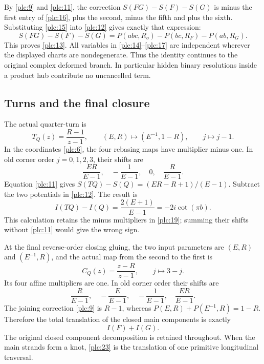 By \eqref{plc:9} and \eqref{plc:11}, the correction \(S(FG)-S(F)-S(G)\) is minus the first
entry of \eqref{plc:16}, plus the second, minus the fifth and plus the sixth.
Substituting \eqref{plc:15} into \eqref{plc:12} gives exactly that expression: \begin{equation}
S(FG)-S(F)-S(G)
                  =P(abc,R_o)-P(bc,R_F)-P(ab,R_G).
\label{plc:17}
\end{equation} This proves \eqref{plc:13}. All variables in \eqref{plc:14}--\eqref{plc:17} are independent
wherever the displayed charts are nondegenerate. Thus the identity
continues to the original complex deformed branch. In particular hidden
binary resolutions inside a product hub contribute no uncancelled term.

\subsection{Turns and the final
closure}\label{turns-and-the-final-closure}

The actual quarter-turn is \begin{equation}
T_Q(z)=\frac{R-1}{z-1},\qquad
 (E,R)\longmapsto(E^{-1},1-R),\qquad j\longmapsto j-1.
\label{plc:18}
\end{equation} In the coordinates \eqref{plc:6}, the four rebasing maps have multiplier minus
one. In old corner order \(j=0,1,2,3\), their shifts are \begin{equation}
\frac{ER}{E-1},\quad-\frac1{E-1},\quad0,\quad\frac R{E-1}.
\label{plc:19}
\end{equation} Equation \eqref{plc:11} gives \(S(TQ)-S(Q)=(ER-R+1)/(E-1)\). Subtract the two
potentials in \eqref{plc:12}. The result is \begin{equation}
I(TQ)-I(Q)=\frac{2(E+1)}{E-1}=-2i\cot(\pi b).
\label{plc:20}
\end{equation} This calculation retains the minus multipliers in \eqref{plc:19}; summing their
shifts without \eqref{plc:11} would give the wrong sign.

At the final reverse-order closing gluing, the two input parameters are
\((E,R)\) and \((E^{-1},R)\), and the actual map from the second to the
first is \begin{equation}
C_Q(z)=\frac{z-R}{z-1},\qquad j\longmapsto3-j.
\label{plc:21}
\end{equation} Its four affine multipliers are one. In old corner order their shifts
are \begin{equation}
\frac R{E-1},\quad-\frac E{E-1},
                       \quad-\frac1{E-1},\quad\frac{ER}{E-1}.
\label{plc:22}
\end{equation} The joining correction \eqref{plc:9} is \(R-1\), whereas
\(P(E,R)+P(E^{-1},R)=1-R\). Therefore the total translation of the
closed main components is exactly \begin{equation}
I(F)+I(G).
\label{plc:23}
\end{equation} The original closed component decomposition is retained throughout.
When the main strands form a knot, \eqref{plc:23} is the translation of one
primitive longitudinal traversal.

